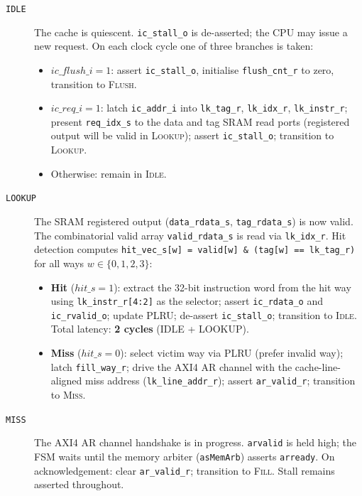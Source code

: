 \begin{description}

  \item[\texttt{IDLE}]
    The cache is quiescent.
    \texttt{ic\_stall\_o} is de-asserted; the CPU may issue a new request.
    On each clock cycle one of three branches is taken:
    \begin{itemize}
      \item $\mathit{ic\_flush\_i}{=}1$: assert \texttt{ic\_stall\_o},
        initialise \texttt{flush\_cnt\_r} to zero, transition to
        \textsc{Flush}.
      \item $\mathit{ic\_req\_i}{=}1$: latch \texttt{ic\_addr\_i} into
        \texttt{lk\_tag\_r}, \texttt{lk\_idx\_r}, \texttt{lk\_instr\_r};
        present \texttt{req\_idx\_s} to the data and tag SRAM read ports
        (registered output will be valid in \textsc{Lookup});
        assert \texttt{ic\_stall\_o}; transition to \textsc{Lookup}.
      \item Otherwise: remain in \textsc{Idle}.
    \end{itemize}

  \item[\texttt{LOOKUP}]
    The SRAM registered output (\texttt{data\_rdata\_s},
    \texttt{tag\_rdata\_s}) is now valid.
    The combinatorial valid array \texttt{valid\_rdata\_s} is read via
    \texttt{lk\_idx\_r}.
    Hit detection computes \texttt{hit\_vec\_s[w] = valid[w] \& (tag[w]
    == lk\_tag\_r)} for all ways $w \in \{0,1,2,3\}$:
    \begin{itemize}
      \item \textbf{Hit} ($\mathit{hit\_s}{=}1$): extract the 32-bit
        instruction word from the hit way using
        \texttt{lk\_instr\_r[4:2]} as the selector; assert
        \texttt{ic\_rdata\_o} and \texttt{ic\_rvalid\_o}; update PLRU;
        de-assert \texttt{ic\_stall\_o}; transition to \textsc{Idle}.
        Total latency: \textbf{2 cycles} (IDLE + LOOKUP).
      \item \textbf{Miss} ($\mathit{hit\_s}{=}0$): select victim way via
        PLRU (prefer invalid way); latch \texttt{fill\_way\_r};
        drive the AXI4 AR channel with the cache-line-aligned miss
        address (\texttt{lk\_line\_addr\_r}); assert
        \texttt{ar\_valid\_r}; transition to \textsc{Miss}.
    \end{itemize}

  \item[\texttt{MISS}]
    The AXI4 AR channel handshake is in progress.
    \texttt{arvalid} is held high; the FSM waits until the memory
    arbiter (\texttt{asMemArb}) asserts \texttt{arready}.
    On acknowledgement: clear \texttt{ar\_valid\_r}; transition to
    \textsc{Fill}.
    Stall remains asserted throughout.


\end{description}

